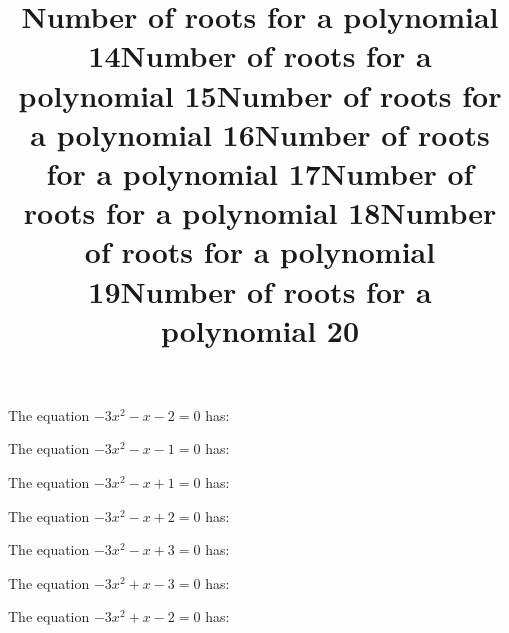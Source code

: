 \documentclass{article}
\begin{document}
\begin{category}
\begin{question}[multichoice]
\end{question}
\begin{question}[multichoice]
\title{Number of roots for a polynomial 14}
The equation $- 3 x^{2} - x - 2=0$ has:



\end{question}
\begin{question}[multichoice]
\title{Number of roots for a polynomial 15}
The equation $- 3 x^{2} - x - 1=0$ has:



\end{question}
\begin{question}[multichoice]
\title{Number of roots for a polynomial 16}
The equation $- 3 x^{2} - x + 1=0$ has:



\end{question}
\begin{question}[multichoice]
\title{Number of roots for a polynomial 17}
The equation $- 3 x^{2} - x + 2=0$ has:



\end{question}
\begin{question}[multichoice]
\title{Number of roots for a polynomial 18}
The equation $- 3 x^{2} - x + 3=0$ has:



\end{question}
\begin{question}[multichoice]
\title{Number of roots for a polynomial 19}
The equation $- 3 x^{2} + x - 3=0$ has:



\end{question}
\begin{question}[multichoice]
\title{Number of roots for a polynomial 20}
The equation $- 3 x^{2} + x - 2=0$ has:


\end{question}
\end{category}
\end{document}
